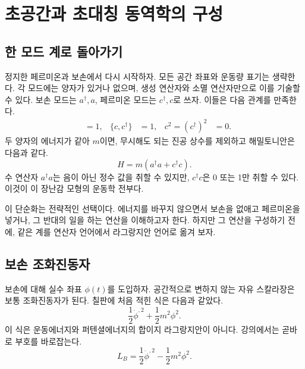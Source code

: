 \chapter{초공간과 초대칭 동역학의 구성}


\section{한 모드 계로 돌아가기}

정지한 페르미온과 보손에서 다시 시작하자. 모든 공간 좌표와 운동량 표기는 생략한다. 각 모드에는 양자가 있거나 없으며, 생성 연산자와 소멸 연산자만으로 이를 기술할 수 있다. 보손 모드는 \(a^\dagger,a\), 페르미온 모드는 \(c^\dagger,c\)로 쓰자. 이들은 다음 관계를 만족한다.
\begin{align}
[a,a^\dagger]&=1,
&
\{c,c^\dagger\}&=1,
&
c^2=(c^\dagger)^2&=0.
\end{align}
두 양자의 에너지가 같아 \(m\)이면, 무시해도 되는 진공 상수를 제외하고 해밀토니안은 다음과 같다.
\begin{equation}
H=m\left(a^\dagger a+c^\dagger c\right).
\label{eq:l7-one-mode-hamiltonian}
\end{equation}
수 연산자 \(a^\dagger a\)는 음이 아닌 정수 값을 취할 수 있지만, \(c^\dagger c\)은 0 또는 1만 취할 수 있다. 이것이 이 장난감 모형의 운동학 전부다.

이 단순화는 전략적인 선택이다. 에너지를 바꾸지 않으면서 보손을 없애고 페르미온을 넣거나, 그 반대의 일을 하는 연산을 이해하고자 한다. 하지만 그 연산을 구성하기 전에, 같은 계를 연산자 언어에서 라그랑지안 언어로 옮겨 보자.

\section{보손 조화진동자}

보손에 대해 실수 좌표 \(\phi(t)\)를 도입하자. 공간적으로 변하지 않는 자유 스칼라장은 보통 조화진동자가 된다. 칠판에 처음 적힌 식은 다음과 같았다.
\[
\frac{1}{2}\dot\phi^{,2}+\frac{1}{2}m^2\phi^2.
\]
이 식은 운동에너지와 퍼텐셜에너지의 합이지 라그랑지안이 아니다. 강의에서는 곧바로 부호를 바로잡는다.
\begin{equation}
L_B=\frac{1}{2}\dot\phi^{,2}-\frac{1}{2}m^2\phi^2.
\label{eq:l7-boson-lagrangian}
\end{equation}

